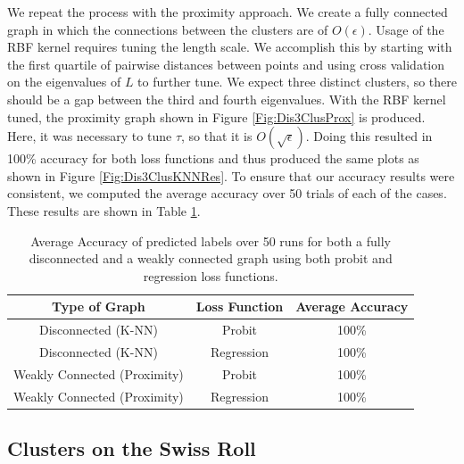 \documentclass[12pt]{amsart}
\begin{document}
We repeat the process with the proximity approach. We create a fully connected graph in which the connections between the clusters are of $O(\epsilon)$. Usage of the RBF kernel requires tuning the length scale. We accomplish this by starting with the first quartile of pairwise distances between points and using cross validation on the eigenvalues of $L$ to further tune. We expect three distinct clusters, so there should be a gap between the third and fourth eigenvalues. With the RBF kernel tuned, the proximity graph shown in Figure \ref{Fig:Dis3ClusProx} is produced. Here, it was necessary to tune $\tau$, so that it is $O(\sqrt{\epsilon})$. Doing this resulted in 100\% accuracy for both loss functions and thus produced the same plots as shown in Figure \ref{Fig:Dis3ClusKNNRes}. To ensure that our accuracy results were consistent, we computed the average accuracy over 50 trials of each of the cases. These results are shown in Table \ref{Table:3ClusRes}.

\begin{table}
\begin{center}
\begin{tabular}{||c c c||} 
 \hline
 Type of Graph & Loss Function & Average Accuracy\\  
 \hline\hline
 Disconnected (K-NN) & Probit & 100\% \\ 
 \hline
 Disconnected (K-NN) & Regression & 100\% \\
 \hline
 Weakly Connected (Proximity) & Probit & 100\% \\
 \hline
 Weakly Connected (Proximity) & Regression & 100\% \\ 
 \hline
\end{tabular}
\caption{Average Accuracy of predicted labels over 50 runs for both a fully disconnected and a weakly connected graph using both probit and regression loss functions.}
\label{Table:3ClusRes}
\end{center}
\end{table}

\subsection{Clusters on the Swiss Roll}
\end{document}
